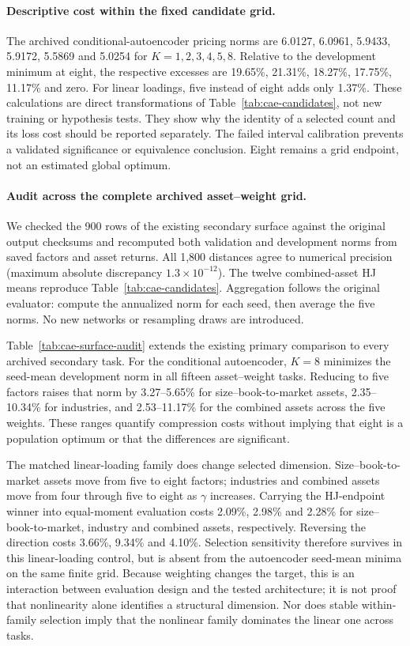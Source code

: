 \paragraph{Descriptive cost within the fixed candidate grid.}
The archived conditional-autoencoder pricing norms are 6.0127, 6.0961, 5.9433, 5.9172, 5.5869 and 5.0254 for $K=1,2,3,4,5,8$. Relative to the development minimum at eight, the respective excesses are 19.65\%, 21.31\%, 18.27\%, 17.75\%, 11.17\% and zero. For linear loadings, five instead of eight adds only 1.37\%. These calculations are direct transformations of Table~\ref{tab:cae-candidates}, not new training or hypothesis tests. They show why the identity of a selected count and its loss cost should be reported separately. The failed interval calibration prevents a validated significance or equivalence conclusion. Eight remains a grid endpoint, not an estimated global optimum.

\paragraph{Audit across the complete archived asset--weight grid.}
We checked the 900 rows of the existing secondary surface against the original output checksums and recomputed both validation and development norms from saved factors and asset returns. All 1,800 distances agree to numerical precision (maximum absolute discrepancy $1.3\times10^{-12}$). The twelve combined-asset HJ means reproduce Table~\ref{tab:cae-candidates}. Aggregation follows the original evaluator: compute the annualized norm for each seed, then average the five norms. No new networks or resampling draws are introduced.



Table~\ref{tab:cae-surface-audit} extends the existing primary comparison to every archived secondary task. For the conditional autoencoder, $K=8$ minimizes the seed-mean development norm in all fifteen asset--weight tasks. Reducing to five factors raises that norm by 3.27--5.65\% for size--book-to-market assets, 2.35--10.34\% for industries, and 2.53--11.17\% for the combined assets across the five weights. These ranges quantify compression costs without implying that eight is a population optimum or that the differences are significant.

The matched linear-loading family does change selected dimension. Size--book-to-market assets move from five to eight factors; industries and combined assets move from four through five to eight as $\gamma$ increases. Carrying the HJ-endpoint winner into equal-moment evaluation costs 2.09\%, 2.98\% and 2.28\% for size--book-to-market, industry and combined assets, respectively. Reversing the direction costs 3.66\%, 9.34\% and 4.10\%. Selection sensitivity therefore survives in this linear-loading control, but is absent from the autoencoder seed-mean minima on the same finite grid. Because weighting changes the target, this is an interaction between evaluation design and the tested architecture; it is not proof that nonlinearity alone identifies a structural dimension. Nor does stable within-family selection imply that the nonlinear family dominates the linear one across tasks.
